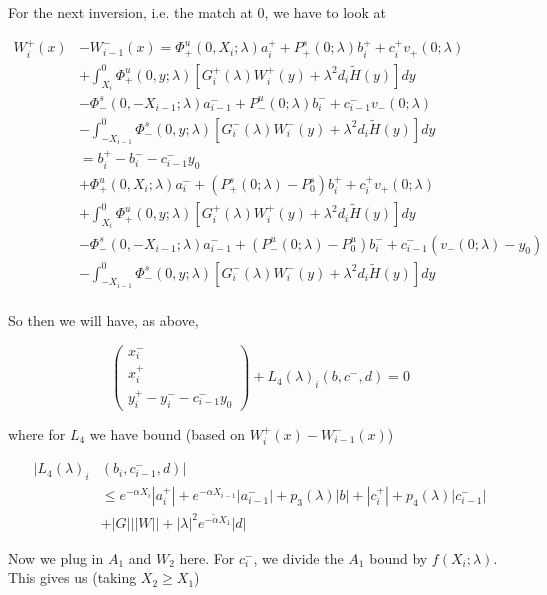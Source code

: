 \documentclass[12pt]{article}
\begin{document}
\begin{enumerate}
For the next inversion, i.e. the match at 0, we have to look at 

\begin{align*}
W_i^+(x) &- W_{i-1}^-(x) = \Phi^u_+(0, X_i; \lambda)a_i^+ + P^s_+(0; \lambda)b_i^+ + c_i^+ v_+(0; \lambda) \\
&+ \int_{X_i}^0 \Phi^u_+(0, y; \lambda) [ G_i^+(\lambda)W_i^+(y) + \lambda^2 d_i \tilde{H}(y) ] dy \\
&- \Phi^s_-(0, -X_{i-1}; \lambda)a_{i-1}^- + P^u_-(0; \lambda)b_i^- + c_{i-1}^-  v_-(0; \lambda) \\
&- \int_{-X_{i-1}}^0 \Phi^s_-(0, y; \lambda) [ G_i^-(\lambda)W_i^-(y) + \lambda^2 d_i \tilde{H}(y) ] dy \\
&= b_i^+ - b_i^- - c_{i-1}^- y_0 \\
&+ \Phi^u_+(0, X_i; \lambda)a_i^- + (P^s_+(0; \lambda) - P^s_0)b_i^+ + c_i^+ v_+(0; \lambda) \\
&+ \int_{X_i}^0 \Phi^u_+(0, y; \lambda) [ G_i^+(\lambda)W_i^+(y) + \lambda^2 d_i \tilde{H}(y) ] dy \\
&- \Phi^s_-(0, -X_{i-1}; \lambda)a_{i-1}^- + (P^u_-(0; \lambda) - P^u_0)b_i^- + c_{i-1}^- (v_-(0; \lambda) - y_0) \\
&- \int_{-X_{i-1}}^0 \Phi^s_-(0, y; \lambda) [ G_i^-(\lambda)W_i^-(y) + \lambda^2 d_i \tilde{H}(y) ] dy \\
\end{align*}

So then we will have, as above,

\[
\begin{pmatrix}x_i^- \\ x_i^+ \\ y_i^+ - y_i^- - c_{i-1}^- y_0 \end{pmatrix} + L_4(\lambda)_i(b, c^-, d) = 0
\]

where for $L_4$ we have bound (based on $W_i^+(x) - W_{i-1}^-(x)$)

\begin{align*}
|L_4(\lambda)_i&(b_i, c_{i-1}^-, d)| \\
&\leq e^{-\alpha X_i}|a_i^+| + e^{-\alpha X_{i-1}}|a_{i-1}^-| + p_3(\lambda)|b| + |c_i^+| + p_4(\lambda) |c_{i-1}^-| \\
&+ |G|||W|| + |\lambda|^2 e^{-\tilde{\alpha}X_1} |d| 
\end{align*}

Now we plug in $A_1$ and $W_2$ here. For $c_i^-$, we divide the $A_1$ bound by $f(X_i; \lambda)$. This gives us (taking $X_2 \geq X_1$)


\end{enumerate}
\end{document}
